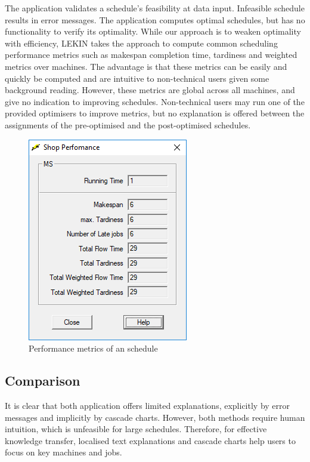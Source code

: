 The application validates a schedule's feasibility at data input. Infeasible schedule results in error messages. The application computes optimal schedules, but has no functionality to verify its optimality. While our approach is to weaken optimality with efficiency, LEKIN takes the approach to compute common scheduling performance metrics such as makespan completion time, tardiness and weighted metrics over machines. The advantage is that these metrics can be easily and quickly be computed and are intuitive to non-technical users given some background reading. However, these metrics are global across all machines, and give no indication to improving schedules. Non-technical users may run one of the provided optimisers to improve metrics, but no explanation is offered between the assignments of the pre-optimised and the post-optimised schedules.

\begin{figure}[H]
	\begin{center}
		\includegraphics[scale=0.8]{figures/lekin_metric.png}
	\end{center}
	\caption{Performance metrics of an schedule}
\end{figure}

\subsection{Comparison}

It is clear that both application offers limited explanations, explicitly by error messages and implicitly by cascade charts. However, both methods require human intuition, which is unfeasible for large schedules. Therefore, for effective knowledge transfer, localised text explanations and cascade charts help users to focus on key machines and jobs.